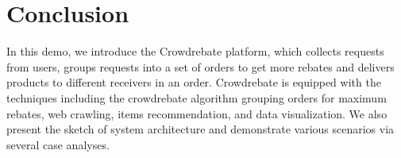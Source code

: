 \section{Conclusion} \vspace{-1ex}
\label{sec:conclusion}

In this demo, we introduce the Crowdrebate platform, which collects requests from users, groups requests into a set of orders to get more rebates and delivers products to different receivers in an order. Crowdrebate is equipped with the techniques including the crowdrebate algorithm grouping orders for maximum rebates, web crawling, items recommendation, and data visualization. We also present the sketch of system architecture and demonstrate various scenarios via several case analyses. 
 
 \vspace{-1.5ex}